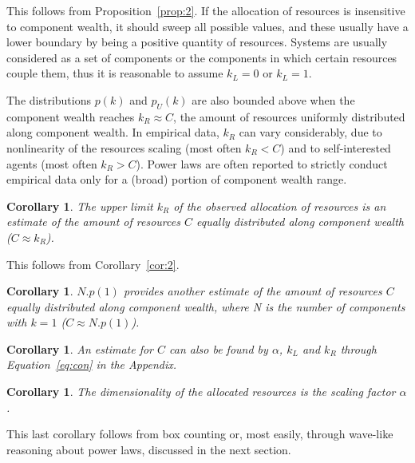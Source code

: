 \documentclass[10pt,letterpaper]{article}
\newtheorem{corollary}[theorem2]{Corollary}
\begin{document}
This follows from Proposition~\ref{prop:2}.
If the allocation of resources is insensitive to component wealth,
it should sweep all possible values, and these usually
have a lower boundary by being a positive quantity of resources.
Systems are usually considered as a set of components
or the components in which certain resources couple them,
thus it is reasonable to assume $k_L=0$ or $k_L=1$.

The distributions $p(k)$ and $p_U(k)$ are also
bounded above when the component wealth reaches $k_R \approx C$,
the amount of resources uniformly distributed along component wealth.
In empirical data, $k_R$ can vary considerably, due to
nonlinearity of the resources scaling (most often $k_R<C$) and
to self-interested agents (most often $k_R>C$).
Power laws are often reported to strictly conduct empirical data
only for a (broad) portion of component wealth range.


\begin{corollary}
	The upper limit $k_R$ of the observed allocation of resources is an estimate of the amount of resources $C$ equally distributed along component wealth ($C\approx k_R$).
\end{corollary}

This follows from Corollary~\ref{cor:2}.

\begin{corollary}
	$N . p(1)$ provides another estimate of the amount of resources $C$ equally distributed along component wealth, where N is the number of components with $k=1$ ($C\approx N . p(1)$).
\end{corollary}

\begin{corollary}
	An estimate for $C$ can also be found by $\alpha$, $k_L$ and $k_R$ through Equation~\ref{eq:con} in the Appendix.
\end{corollary}

\begin{corollary}
	The dimensionality of the allocated resources is the scaling factor $\alpha$.
\end{corollary}

This last corollary follows from box counting or, most easily,
through wave-like reasoning about power laws, discussed in the next section.
\end{document}
